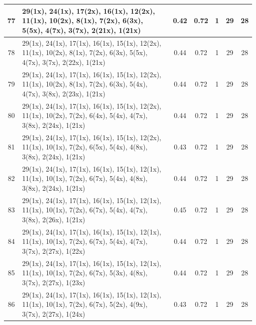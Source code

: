 \begin{small}
\begin{longtable}{|c|p{4cm}|c|c|c|c|c|}
  77 & 29(1x), 24(1x), 17(2x), 16(1x), 12(2x), 11(1x), 10(2x), 8(1x), 7(2x), 6(3x), 5(5x), 4(7x), 3(7x), 2(21x), 1(21x) & \cellcolor{colorGood}  0.42 & \cellcolor{colorGood} 0.72 & 1 & 29 & \cellcolor{colorBad} 28 \\   \hline
  78 & 29(1x), 24(1x), 17(1x), 16(1x), 15(1x), 12(2x), 11(1x), 10(2x), 8(1x), 7(2x), 6(3x), 5(5x), 4(7x), 3(7x), 2(22x), 1(21x) & \cellcolor{colorGood}  0.44 & \cellcolor{colorGood} 0.72 & 1 & 29 & \cellcolor{colorBad} 28 \\   \hline
  79 & 29(1x), 24(1x), 17(1x), 16(1x), 15(1x), 12(2x), 11(1x), 10(2x), 8(1x), 7(2x), 6(3x), 5(4x), 4(7x), 3(8x), 2(23x), 1(21x) & \cellcolor{colorGood}  0.44 & \cellcolor{colorGood} 0.72 & 1 & 29 & \cellcolor{colorBad} 28 \\   \hline
  80 & 29(1x), 24(1x), 17(1x), 16(1x), 15(1x), 12(2x), 11(1x), 10(2x), 7(2x), 6(4x), 5(4x), 4(7x), 3(8x), 2(24x), 1(21x) & \cellcolor{colorGood}  0.44 & \cellcolor{colorGood} 0.72 & 1 & 29 & \cellcolor{colorBad} 28 \\   \hline
  81 & 29(1x), 24(1x), 17(1x), 16(1x), 15(1x), 12(2x), 11(1x), 10(1x), 7(2x), 6(5x), 5(4x), 4(8x), 3(8x), 2(24x), 1(21x) & \cellcolor{colorGood}  0.43 & \cellcolor{colorGood} 0.72 & 1 & 29 & \cellcolor{colorBad} 28 \\   \hline
  82 & 29(1x), 24(1x), 17(1x), 16(1x), 15(1x), 12(1x), 11(1x), 10(1x), 7(2x), 6(7x), 5(4x), 4(8x), 3(8x), 2(24x), 1(21x) & \cellcolor{colorGood}  0.44 & \cellcolor{colorGood} 0.72 & 1 & 29 & \cellcolor{colorBad} 28 \\   \hline
  83 & 29(1x), 24(1x), 17(1x), 16(1x), 15(1x), 12(1x), 11(1x), 10(1x), 7(2x), 6(7x), 5(4x), 4(7x), 3(8x), 2(26x), 1(21x) & \cellcolor{colorGood}  0.45 & \cellcolor{colorGood} 0.72 & 1 & 29 & \cellcolor{colorBad} 28 \\   \hline
  84 & 29(1x), 24(1x), 17(1x), 16(1x), 15(1x), 12(1x), 11(1x), 10(1x), 7(2x), 6(7x), 5(4x), 4(7x), 3(7x), 2(27x), 1(22x) & \cellcolor{colorGood}  0.44 & \cellcolor{colorGood} 0.72 & 1 & 29 & \cellcolor{colorBad} 28 \\   \hline
  85 & 29(1x), 24(1x), 17(1x), 16(1x), 15(1x), 12(1x), 11(1x), 10(1x), 7(2x), 6(7x), 5(3x), 4(8x), 3(7x), 2(27x), 1(23x) & \cellcolor{colorGood}  0.44 & \cellcolor{colorGood} 0.72 & 1 & 29 & \cellcolor{colorBad} 28 \\   \hline
  86 & 29(1x), 24(1x), 17(1x), 16(1x), 15(1x), 12(1x), 11(1x), 10(1x), 7(2x), 6(7x), 5(2x), 4(9x), 3(7x), 2(27x), 1(24x) & \cellcolor{colorGood}  0.43 & \cellcolor{colorGood} 0.72 & 1 & 29 & \cellcolor{colorBad} 28 \\   \hline

\end{longtable}
\end{small}
